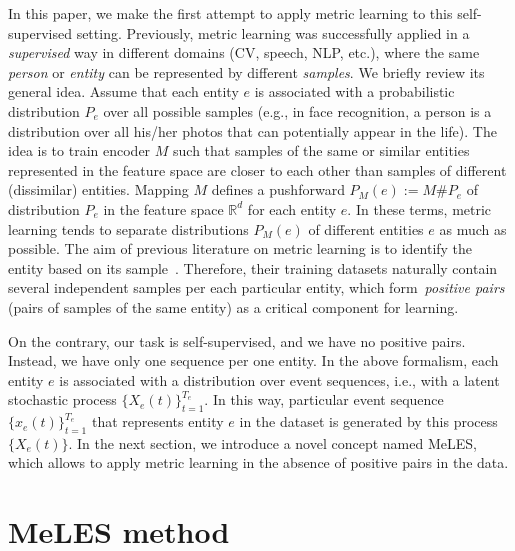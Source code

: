 \documentclass{article}
\newcommand{\R}{\mathbb{R}}
\begin{document}
In this paper, we make the first attempt to apply metric learning to this self-supervised setting. Previously, metric learning was successfully applied in a \textit{supervised} way in different domains (CV, speech, NLP, etc.), where the same \textit{person} or \textit{entity} can be represented by different \textit{samples}. We briefly review its general idea. Assume that each entity $e$ is associated with a probabilistic distribution $P_e$ over all possible samples (e.g., in face recognition, a person is a distribution over all his/her photos that can potentially appear in the life). The idea is to train encoder $M$ such that samples of the same or similar entities represented in the feature space are closer to each other than samples of different (dissimilar) entities. Mapping $M$ defines a pushforward $P_M(e):=M\#P_e$ of distribution $P_e$ in the feature space $\R^d$ for each entity $e$. In these terms, metric learning tends to separate distributions $P_M(e)$ of different entities $e$ as much as possible. The aim of previous literature on metric learning is to identify the entity based on its sample~\cite{Schroff2015FaceNetAU, Hu2014DiscriminativeDM, Wan2018GeneralizedEL}. Therefore, their training datasets naturally contain several independent samples per each particular entity, which form~\textit{positive pairs} (pairs of samples of the same entity) as a critical component for learning.


On the contrary, our task is self-supervised, and we have no positive pairs. Instead, we have only one sequence per one entity. In the above formalism, each entity $e$ is associated with a distribution over event sequences, i.e., with a latent stochastic process $\{X_e(t)\}_{t=1}^{T_e}$. In this way, particular event sequence $\{x_e(t)\}_{t=1}^{T_e}$ that represents entity $e$ in the dataset is generated by this process $\{X_e(t)\}$. In the next section, we introduce a novel concept named MeLES, which allows to apply metric learning in the absence of positive pairs in the data.

\section{MeLES method} \label{sec-method}
\end{document}
